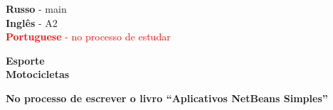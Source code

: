 

\begin{minipage}[t]{0.3\textwidth}
    \vspace{-\baselineskip} %


    \textbf{Russo} - main\\
    \textbf{Inglês} - A2\\
    \textcolor{red}{\textbf{Portuguese} - no processo de estudar}
\end{minipage}
\hfill
\begin{minipage}[t]{0.3\textwidth}
    \vspace{-\baselineskip} %


    \textbf{Esporte} \\
    \textbf{Motocicletas}

\end{minipage}
\hfill
\begin{minipage}[t]{0.3\textwidth}
    \vspace{-\baselineskip} %


    \textbf{No processo de escrever o livro \enquote{Aplicativos NetBeans Simples}}
\end{minipage}

